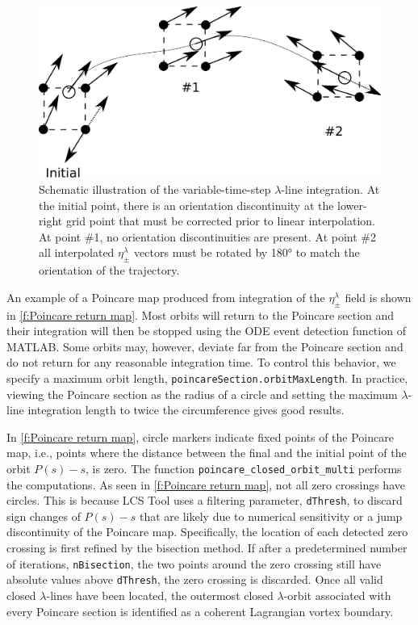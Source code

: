 \documentclass{article}
\begin{document}
\begin{figure}
\begin{center}
\includegraphics[width=.8\textwidth]{graphics/variable_step_integration}
\end{center}
\caption{Schematic illustration of the variable-time-step $\lambda$-line integration. At the initial point, there is an orientation discontinuity at the lower-right grid point that must be corrected prior to linear interpolation. At point \#1, no orientation discontinuities are present. At point \#2 all interpolated $\eta_\pm^\lambda$ vectors must be rotated by 180° to match the orientation of the trajectory.}
\label{f:variable step integration}
\end{figure}

An example of a Poincare map produced from integration of the $\eta_\pm^\lambda$ field is shown in \cref{f:Poincare return map}. Most orbits will return to the Poincare section and their integration will then be stopped using the ODE event detection function of MATLAB. Some orbits may, however, deviate far from the Poincare section and do not return for any reasonable integration time. To control this behavior, we specify a maximum orbit length, \lstinline!poincareSection.orbitMaxLength!. In practice, viewing the Poincare section as the radius of a circle and setting the maximum $\lambda$-line integration length to twice the circumference gives good results.

In \cref{f:Poincare return map}, circle markers indicate fixed points of the Poincare map, i.e., points where the distance between the final and the initial point of the orbit $P(s) - s$, is zero. The function \lstinline!poincare_closed_orbit_multi! performs the computations. As seen in \cref{f:Poincare return map}, not all zero crossings have circles. This is because LCS Tool uses a filtering parameter, \lstinline!dThresh!, to discard sign changes of $P(s) - s$ that are likely due to numerical sensitivity or a jump discontinuity of the Poincare map. Specifically, the location of each detected zero crossing is first refined by the bisection method. If after a predetermined number of iterations, \lstinline!nBisection!, the two points around the zero crossing still have absolute values above \lstinline!dThresh!, the zero crossing is discarded.  Once all valid closed $\lambda$-lines have been located, the outermost closed $\lambda$-orbit associated with every Poincare section is identified as a coherent Lagrangian vortex boundary.
\end{document}
